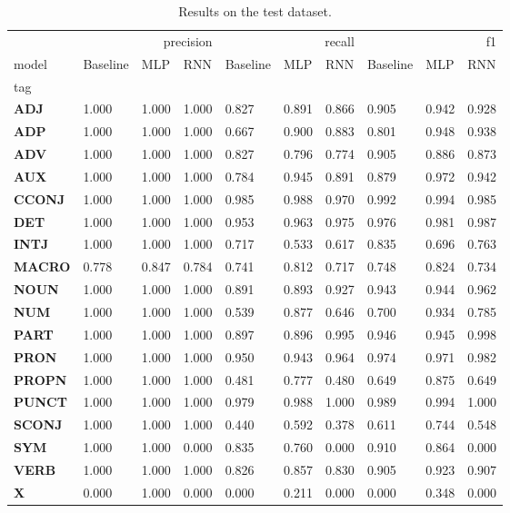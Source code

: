 \begin{table}
\caption{Results on the test dataset.}
\label{tab::ex_2_test}
\begin{tabular}{|l||l||l||l||l||l||l||l||l||l|}
\toprule
 & \multicolumn{3}{r}{precision} & \multicolumn{3}{r}{recall} & \multicolumn{3}{r}{f1} \\
model & Baseline & MLP & RNN & Baseline & MLP & RNN & Baseline & MLP & RNN \\
tag &  &  &  &  &  &  &  &  &  \\
\midrule
\textbf{ADJ} & 1.000 & 1.000 & 1.000 & 0.827 & 0.891 & 0.866 & 0.905 & 0.942 & 0.928 \\
\textbf{ADP} & 1.000 & 1.000 & 1.000 & 0.667 & 0.900 & 0.883 & 0.801 & 0.948 & 0.938 \\
\textbf{ADV} & 1.000 & 1.000 & 1.000 & 0.827 & 0.796 & 0.774 & 0.905 & 0.886 & 0.873 \\
\textbf{AUX} & 1.000 & 1.000 & 1.000 & 0.784 & 0.945 & 0.891 & 0.879 & 0.972 & 0.942 \\
\textbf{CCONJ} & 1.000 & 1.000 & 1.000 & 0.985 & 0.988 & 0.970 & 0.992 & 0.994 & 0.985 \\
\textbf{DET} & 1.000 & 1.000 & 1.000 & 0.953 & 0.963 & 0.975 & 0.976 & 0.981 & 0.987 \\
\textbf{INTJ} & 1.000 & 1.000 & 1.000 & 0.717 & 0.533 & 0.617 & 0.835 & 0.696 & 0.763 \\
\textbf{MACRO} & 0.778 & 0.847 & 0.784 & 0.741 & 0.812 & 0.717 & 0.748 & 0.824 & 0.734 \\
\textbf{NOUN} & 1.000 & 1.000 & 1.000 & 0.891 & 0.893 & 0.927 & 0.943 & 0.944 & 0.962 \\
\textbf{NUM} & 1.000 & 1.000 & 1.000 & 0.539 & 0.877 & 0.646 & 0.700 & 0.934 & 0.785 \\
\textbf{PART} & 1.000 & 1.000 & 1.000 & 0.897 & 0.896 & 0.995 & 0.946 & 0.945 & 0.998 \\
\textbf{PRON} & 1.000 & 1.000 & 1.000 & 0.950 & 0.943 & 0.964 & 0.974 & 0.971 & 0.982 \\
\textbf{PROPN} & 1.000 & 1.000 & 1.000 & 0.481 & 0.777 & 0.480 & 0.649 & 0.875 & 0.649 \\
\textbf{PUNCT} & 1.000 & 1.000 & 1.000 & 0.979 & 0.988 & 1.000 & 0.989 & 0.994 & 1.000 \\
\textbf{SCONJ} & 1.000 & 1.000 & 1.000 & 0.440 & 0.592 & 0.378 & 0.611 & 0.744 & 0.548 \\
\textbf{SYM} & 1.000 & 1.000 & 0.000 & 0.835 & 0.760 & 0.000 & 0.910 & 0.864 & 0.000 \\
\textbf{VERB} & 1.000 & 1.000 & 1.000 & 0.826 & 0.857 & 0.830 & 0.905 & 0.923 & 0.907 \\
\textbf{X} & 0.000 & 1.000 & 0.000 & 0.000 & 0.211 & 0.000 & 0.000 & 0.348 & 0.000 \\
\bottomrule
\end{tabular}
\end{table}
